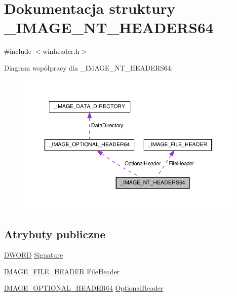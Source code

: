 \hypertarget{struct___i_m_a_g_e___n_t___h_e_a_d_e_r_s64}{\section{Dokumentacja struktury \-\_\-\-I\-M\-A\-G\-E\-\_\-\-N\-T\-\_\-\-H\-E\-A\-D\-E\-R\-S64}
\label{struct___i_m_a_g_e___n_t___h_e_a_d_e_r_s64}
}


{\ttfamily \#include $<$winheader.\-h$>$}



Diagram współpracy dla \-\_\-\-I\-M\-A\-G\-E\-\_\-\-N\-T\-\_\-\-H\-E\-A\-D\-E\-R\-S64\-:\nopagebreak
\begin{figure}[H]
\begin{center}
\leavevmode
\includegraphics[width=350pt]{struct___i_m_a_g_e___n_t___h_e_a_d_e_r_s64__coll__graph}
\end{center}
\end{figure}
\subsection*{Atrybuty publiczne}
\begin{DoxyCompactItemize}
\item 
\hyperlink{winheader_8h_af483253b2143078cede883fc3c111ad2}{D\-W\-O\-R\-D} \hyperlink{struct___i_m_a_g_e___n_t___h_e_a_d_e_r_s64_a846d3eb78fd95dc71db36e89269d81cb}{Signature}
\item 
\hyperlink{winheader_8h_ab18994ab54fdb55d1542f30b3895ab10}{I\-M\-A\-G\-E\-\_\-\-F\-I\-L\-E\-\_\-\-H\-E\-A\-D\-E\-R} \hyperlink{struct___i_m_a_g_e___n_t___h_e_a_d_e_r_s64_a90697a3d56043dee58cbf21b30363863}{File\-Header}
\item 
\hyperlink{winheader_8h_a955345df2edf902d02dabe2aa7a82495}{I\-M\-A\-G\-E\-\_\-\-O\-P\-T\-I\-O\-N\-A\-L\-\_\-\-H\-E\-A\-D\-E\-R64} \hyperlink{struct___i_m_a_g_e___n_t___h_e_a_d_e_r_s64_a50eaffc01bf927048dc730c15b5ed3f1}{Optional\-Header}
\end{DoxyCompactItemize}


